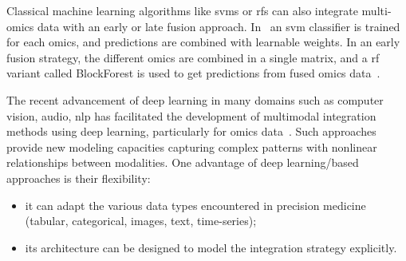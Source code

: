 \documentclass[../main.tex]{subfiles}
\begin{document}
	Classical machine learning algorithms like \glspl{svm} or \glspl{rf} can also integrate multi-omics data with an early or late fusion approach.
	In~\cite{CarrilloPerez2022} an \gls{svm} classifier is trained for each omics, and predictions are combined with learnable weights.
	In an early fusion strategy, the different omics are combined in a single matrix, and a \gls{rf} variant called BlockForest is used to get predictions from fused omics data~\cite{Hornung2019}.

	The recent advancement of deep learning in many domains such as computer vision, audio, \gls{nlp} has facilitated the development of multimodal integration methods using deep learning, particularly for omics data~\cite{Kang2021}.
	Such approaches provide new modeling capacities capturing complex patterns with nonlinear relationships between modalities.
	One advantage of deep learning\-/based approaches is their flexibility:
	\begin{itemize}[nosep]
		\item it can adapt the various data types encountered in precision medicine (tabular, categorical, images, text, time-series);
		\item its architecture can be designed to model the integration strategy explicitly.
	\end{itemize}

\end{document}
